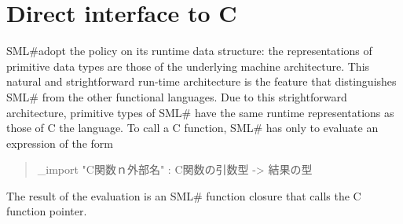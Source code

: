 \documentclass{jbook}
\newif\ifjp
\newcommand{\txt}[2]{#2}
\newcommand{\smlsharp}{SML\#}
\newenvironment{program}{\begin{quote}\begin{tt}}%
                        {\end{tt}\end{quote}}
\begin{document}
\section{\txt{Ｃとの連携機能}{Direct interface to C}}
\ifjp%
	\smlsharp{}は，その実行時の原始データ型の表現は，計算機アーキテ
クチャが提供する表現を採用している．
	この当たり前の実行時アーキテクチャは，既存の関数型言語にはない
\smlsharp{}の際立った特長である．
	これにより，\smlsharp{}の原始データ型はC言語の原始データ型の同一
の表現であり，広範囲のC言語関数を直接呼び出すことができる．
	C言語の関数を呼び出すには，\smlsharp{}プログラムから
以下の式を評価すればよい．
\begin{program}
\_import "C関数ｎ外部名" : C関数の引数型 -> 結果の型
\end{program}
	この評価結果は，C言語の関数ポインタを呼び出すシーケンスを実行す
る\smlsharp{}の関数閉包である．
\else%
	\smlsharp{}adopt the policy on its runtime data
structure: the representations of primitive data types are those of the
underlying machine architecture.
	This natural and strightforward run-time architecture is the
feature that distinguishes \smlsharp{} from the other functional
languages.
	Due to this strightforward architecture, primitive types of
\smlsharp{} have the same runtime representations as those of C
the language.
	To call a C function, \smlsharp{} has only to evaluate an
expression of the form
\begin{program}
\_import "C関数ｎ外部名" : C関数の引数型 -> 結果の型
\end{program}
	The result of the evaluation is an \smlsharp{} function closure
that calls the C function pointer.
\fi%
\end{document}
